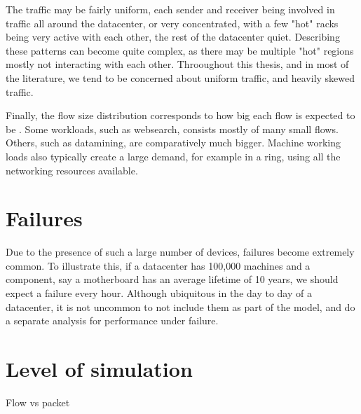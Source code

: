 The traffic may be fairly uniform, each sender and receiver being involved in traffic all around the datacenter, or very concentrated, with a few "hot" racks being very active with each other, the rest of the datacenter quiet.
Describing these patterns can become quite complex, as there may be multiple "hot" regions mostly not interacting with each other.
Throoughout this thesis, and in most of the literature, we tend to be concerned about uniform traffic, and heavily skewed traffic. %

Finally, the flow size distribution corresponds to how big each flow is expected to be \cite{alizadeh_data_2010}.
Some workloads, such as websearch, consists mostly of many small flows.
Others, such as datamining, are comparatively much bigger.
Machine working loads also typically create a large demand, for example in a ring, using all the networking resources available.

\section{Failures} \label{failures} %

Due to the presence of such a large number of devices, failures become extremely common. %
To illustrate this, if a datacenter has 100,000 machines and a component, say a motherboard has an average lifetime of 10 years, we should expect a failure every hour.
Although ubiquitous in the day to day of a datacenter, it is not uncommon to not include them as part of the model, and do a separate analysis for performance under failure. %

\section{Level of simulation} \label{model-level}

Flow vs packet